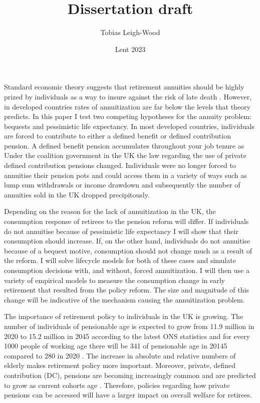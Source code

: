 \documentclass[12pt]{article}
\date{Lent 2023}
\title{Dissertation draft}
\author{Tobias Leigh-Wood}
\begin{document}
\maketitle


Standard economic theory suggests that retirement annuities should be highly prized by individuals as a way to
insure against the risk of late death \cite{yaari_65}. However, in developed countries rates of annuitization are far below the
levels that theory predicts. In this paper I test two competing hypotheses for the annuity problem: bequests and
pessimistic life expectancy. In most developed countries, individuals are forced to contribute to either a defined
benefit or defined contribution pension. A defined benefit pension accumulates throughout your job tenure as
Under the coalition government in the UK the law regarding the use of private defined
contribution pensions changed. Individuals were no longer forced to annuitise their pension pots and could access
them in a variety of ways such as lump sum withdrawals or income drawdown and subsequently the number of annuities
sold in the UK dropped precipitously.


Depending on the reason for the lack of annuitization in the UK, the consumption response of retirees to the pension
reform will differ. If individuals do not annuitise because of pessimistic life expectancy I will show that their
consumption should increase. If, on the other hand, individuals do not annuitise because of a bequest motive, consumption
should not change much as a result of the reform. I will solve lifecycle models for both of these cases and simulate
consumption decisions with, and without, forced annuitization. I will then use a variety of empirical models to measure
the consumption change in early retirement that resulted from the policy reform. The size and magnitude of this change
will be indicative of the mechanism causing the annuitization problem.

The importance of retirement policy to individuals in the UK is growing. The number of individuals of
pensionable age is expected to grow from 11.9 million in 2020 to 15.2 million in
2045 according to the latest ONS statistics and for every 1000 people of working age there will be 341 of pensionable
age in 20145 compared to 280 in 2020 \cite{ons_population_predictions_2020}. The increase in absolute and relative
numbers of elderly makes retirement policy more important. Moreover, private, defined contribution (DC), pensions are
becoming increasingly common and are predicted to grow as current cohorts age \cite{cribb_karjalainen_ifs_2023}.
Therefore, policies regarding how private pensions can be accessed will have a larger impact on overall welfare for
retirees.
\end{document}
